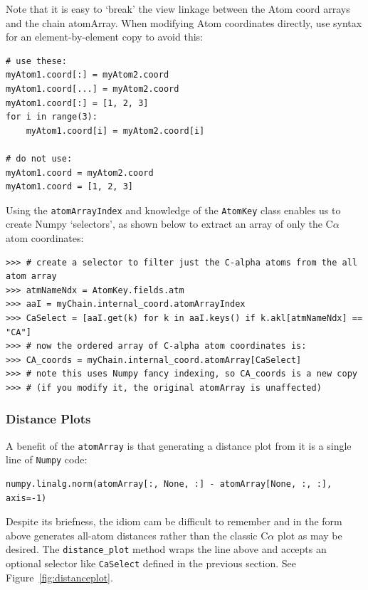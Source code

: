 Note that it is easy to `break' the view linkage between the Atom coord arrays and the
chain atomArray.  When modifying Atom coordinates directly, use syntax for an
element-by-element copy to avoid this:

\begin{verbatim}
# use these:
myAtom1.coord[:] = myAtom2.coord
myAtom1.coord[...] = myAtom2.coord
myAtom1.coord[:] = [1, 2, 3]
for i in range(3):
    myAtom1.coord[i] = myAtom2.coord[i]

# do not use:
myAtom1.coord = myAtom2.coord
myAtom1.coord = [1, 2, 3]
\end{verbatim}


Using the \texttt{atomArrayIndex} and knowledge of the \texttt{AtomKey} class
enables us to create Numpy `selectors', as shown below to extract an array of
only the C$\alpha$ atom coordinates:

\begin{verbatim}
>>> # create a selector to filter just the C-alpha atoms from the all atom array
>>> atmNameNdx = AtomKey.fields.atm
>>> aaI = myChain.internal_coord.atomArrayIndex
>>> CaSelect = [aaI.get(k) for k in aaI.keys() if k.akl[atmNameNdx] == "CA"]
>>> # now the ordered array of C-alpha atom coordinates is:
>>> CA_coords = myChain.internal_coord.atomArray[CaSelect]
>>> # note this uses Numpy fancy indexing, so CA_coords is a new copy
>>> # (if you modify it, the original atomArray is unaffected)
\end{verbatim}

\subsubsection{Distance Plots}

A benefit of the \texttt{atomArray} is that generating a distance plot from it
is a single line of \texttt{Numpy} code:

\begin{verbatim}
numpy.linalg.norm(atomArray[:, None, :] - atomArray[None, :, :], axis=-1)
\end{verbatim}

Despite its briefness, the idiom cam be difficult to remember and in the form
above generates all-atom distances rather than the classic C$\alpha$ plot
as may be desired.  The \texttt{distance\_plot\(\)} method wraps the line above
and accepts an optional selector like \texttt{CaSelect} defined in the previous
section.  See Figure~\ref{fig:distanceplot}.

